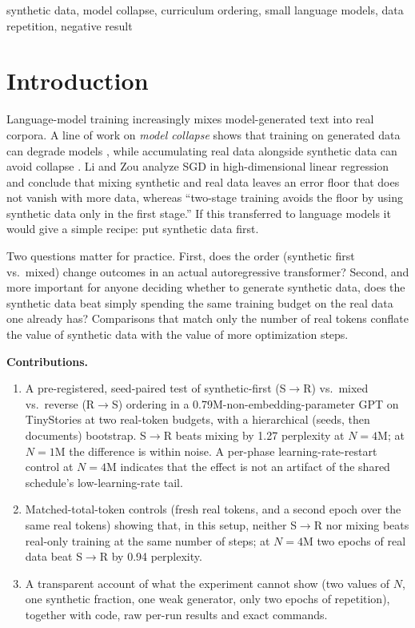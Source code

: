\documentclass[conference]{IEEEtran}
\newcommand{\SR}{S$\to$R}
\newcommand{\RS}{R$\to$S}
\begin{document}
\begin{IEEEkeywords}
synthetic data, model collapse, curriculum ordering, small language models, data repetition, negative result
\end{IEEEkeywords}

\section{Introduction}
Language-model training increasingly mixes model-generated text into real corpora. A line of work on \emph{model collapse} shows that training on generated data can degrade models \cite{shumailov2023curse,dohmatob2024strong,wang2024finite}, while accumulating real data alongside synthetic data can avoid collapse \cite{gerstgrasser2024collapse}. Li and Zou \cite{li2026synthetic} analyze SGD in high-dimensional linear regression and conclude that mixing synthetic and real data leaves an error floor that does not vanish with more data, whereas ``two-stage training avoids the floor by using synthetic data only in the first stage.'' If this transferred to language models it would give a simple recipe: put synthetic data first.

Two questions matter for practice. First, does the order (synthetic first vs.\ mixed) change outcomes in an actual autoregressive transformer? Second, and more important for anyone deciding whether to generate synthetic data, does the synthetic data beat simply spending the same training budget on the real data one already has? Comparisons that match only the number of real tokens conflate the value of synthetic data with the value of more optimization steps.

\textbf{Contributions.}
\begin{enumerate}
\item A pre-registered, seed-paired test of synthetic-first (\SR) vs.\ mixed vs.\ reverse (\RS) ordering in a 0.79M-non-embedding-parameter GPT on TinyStories \cite{eldan2023tinystories} at two real-token budgets, with a hierarchical (seeds, then documents) bootstrap. \SR{} beats mixing by 1.27 perplexity at $N{=}4$M; at $N{=}1$M the difference is within noise. A per-phase learning-rate-restart control at $N{=}4$M indicates that the effect is not an artifact of the shared schedule's low-learning-rate tail.
\item Matched-total-token controls (fresh real tokens, and a second epoch over the same real tokens) showing that, in this setup, neither \SR{} nor mixing beats real-only training at the same number of steps; at $N{=}4$M two epochs of real data beat \SR{} by 0.94 perplexity.
\item A transparent account of what the experiment cannot show (two values of $N$, one synthetic fraction, one weak generator, only two epochs of repetition), together with code, raw per-run results and exact commands.
\end{enumerate}
\end{document}

